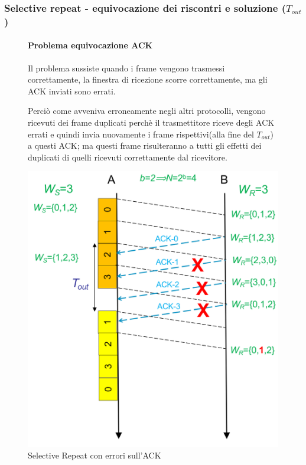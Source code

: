 \newpage

\subsubsection{Selective repeat - equivocazione dei riscontri e soluzione ($T_{out}$)}

\begin{figure}[htbp]
    \centering
    \begin{minipage}{0.48\textwidth}
        \paragraph{Problema equivocazione ACK}
        Il problema sussiste quando i frame vengono trasmessi correttamente, la finestra di ricezione scorre correttamente, ma gli ACK inviati sono errati.

        Perciò come avveniva erroneamente negli altri protocolli, vengono ricevuti dei frame duplicati perchè il trasmettitore riceve degli ACK errati e quindi invia nuovamente i frame rispettivi(alla fine del $T_{out}$) a questi ACK; ma questi frame risulteranno a tutti gli effetti dei duplicati di quelli ricevuti correttamente dal ricevitore.
    \end{minipage}%
    \hfill
    \begin{minipage}{0.45\textwidth}
        \includegraphics[width=\linewidth]{images/srequivocazione.png}
        \caption{Selective Repeat con errori sull'ACK}
    \end{minipage}
\end{figure}



